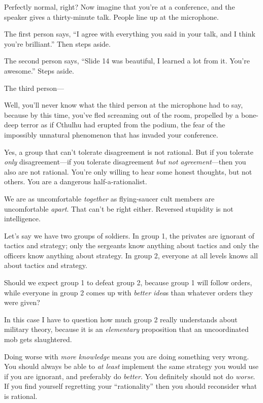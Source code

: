 {
 Perfectly normal, right? Now imagine that you're
at a conference, and the speaker gives a thirty-minute talk. People
line up at the microphone.}

{
 The first person says, ``I agree with everything
you said in your talk, and I think you're
brilliant.'' Then steps aside.}

{
 The second person says, ``Slide 14 was beautiful,
I learned a lot from it. You're
awesome.'' Steps aside.}

{
 The third person---}

{
 Well, you'll never know what the third person at
the microphone had to say, because by this time, you've
fled screaming out of the room, propelled by a bone-deep terror as if
Cthulhu had erupted from the podium, the fear of the impossibly
unnatural phenomenon that has invaded your conference.}

{
 Yes, a group that can't tolerate disagreement is
not rational. But if you tolerate \textit{only} disagreement---if you
tolerate disagreement \textit{but not agreement}{}---then you also are
not rational. You're only willing to hear some honest
thoughts, but not others. You are a dangerous half-a-rationalist.}

{
 We are as uncomfortable \textit{together} as flying-saucer cult
members are uncomfortable \textit{apart}. That can't be
right either. Reversed stupidity is not intelligence.}

{
 Let's say we have two groups of soldiers. In group
1, the privates are ignorant of tactics and strategy; only the
sergeants know anything about tactics and only the officers know
anything about strategy. In group 2, everyone at all levels knows all
about tactics and strategy.}

{
 Should we expect group 1 to defeat group 2, because group 1 will
follow orders, while everyone in group 2 comes up with \textit{better
idea}s than whatever orders they were given?}

{
 In this case I have to question how much group 2 really
understands about military theory, because it is an \textit{elementary}
proposition that an uncoordinated mob gets slaughtered.}

{
 Doing worse with \textit{more knowledge} means you are doing
something very wrong. You should always be able to \textit{at least}
implement the same strategy you would use if you are ignorant, and
preferably do \textit{better}. You definitely should not do
\textit{worse}. If you find yourself regretting your
``rationality'' then you should
reconsider what is rational.}

